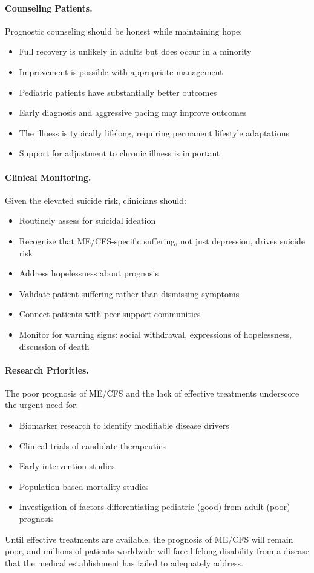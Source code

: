 \paragraph{Counseling Patients.}
Prognostic counseling should be honest while maintaining hope:
\begin{itemize}
    \item Full recovery is unlikely in adults but does occur in a minority
    \item Improvement is possible with appropriate management
    \item Pediatric patients have substantially better outcomes
    \item Early diagnosis and aggressive pacing may improve outcomes
    \item The illness is typically lifelong, requiring permanent lifestyle adaptations
    \item Support for adjustment to chronic illness is important
\end{itemize}

\paragraph{Clinical Monitoring.}
Given the elevated suicide risk, clinicians should:
\begin{itemize}
    \item Routinely assess for suicidal ideation
    \item Recognize that ME/CFS-specific suffering, not just depression, drives suicide risk
    \item Address hopelessness about prognosis
    \item Validate patient suffering rather than dismissing symptoms
    \item Connect patients with peer support communities
    \item Monitor for warning signs: social withdrawal, expressions of hopelessness, discussion of death
\end{itemize}

\paragraph{Research Priorities.}
The poor prognosis of ME/CFS and the lack of effective treatments underscore the urgent need for:
\begin{itemize}
    \item Biomarker research to identify modifiable disease drivers
    \item Clinical trials of candidate therapeutics
    \item Early intervention studies
    \item Population-based mortality studies
    \item Investigation of factors differentiating pediatric (good) from adult (poor) prognosis
\end{itemize}

Until effective treatments are available, the prognosis of ME/CFS will remain poor, and millions of patients worldwide will face lifelong disability from a disease that the medical establishment has failed to adequately address.

